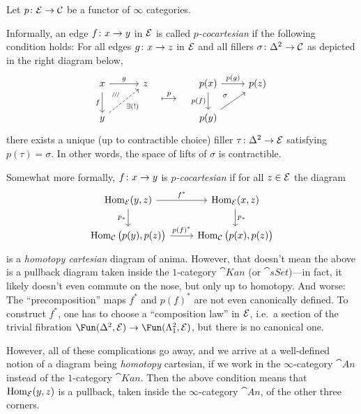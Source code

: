 \documentclass[a4paper, 10pt, oneside, DIV=9, chapterprefix=true, numbers=enddot,bibliography=totoc]{scrbook}
\begin{document}
\begin{defi}\label{def:WeirdCocartesianDefinition}
	Let $p\colon \Ee\morphism\Cc$ be a functor of $\infty$ categories.
	\begin{alphanumerate}
		\item Informally, an edge $f\colon x\morphism y$ in $\mathcal{E}$ is called \emph{$p$-cocartesian} if the following condition holds: For all edges $g\colon x\morphism z$ in $\mathcal{E}$ and all fillers $\sigma\colon \Delta^2\morphism \Cc$ as depicted in the right diagram below,
		\begin{equation*}
			\begin{tikzcd}
				\vphantom{p(x)}x\rar["g"]\dar["f"']\drar[phantom,pos=0.25,"\scriptscriptstyle/\!/\!/"] & z\\
				y \urar[dashed,"\exists(!)"'] & \phantom{p(y)}
			\end{tikzcd}\overset{p}{\longmapsto}\quad
			\begin{tikzcd}
				p(x)\rar["p(g)"]\dar["p(f)"']\drar[phantom,pos=0.15,"\scriptstyle\sigma"] & p(z)\\
				p(y) \urar & \phantom{b}
			\end{tikzcd}
		\end{equation*}
		there exists a unique (up to contractible choice) filler $\tau\colon \Delta^2\morphism\Ee$ satisfying $p(\tau)=\sigma$. In other words, the space of lifts of $\sigma$ is contractible.
		
		Somewhat more formally, $f\colon x\morphism y$ is \emph{$p$-cocartesian} if for all $z\in \mathcal{E}$ the diagram
		\begin{equation*}
			\begin{tikzcd}
				\Hom_\Ee(y,z)\rar["f^*"]\dar["p_*"'] & \Hom_\Ee(x,z)\dar["p_*"]\\
				\Hom_\Cc\big(p(y),p(z)\big)\rar["p(f)^*"] & \Hom_\Cc\big(p(x),p(z)\big)
			\end{tikzcd}
		\end{equation*}
		is a \emph{homotopy cartesian} diagram of anima. However, that doesn't mean the above is a pullback diagram taken inside the $1$-category $\cat{Kan}$ (or $\cat{sSet}$)---in fact, it likely doesn't even commute on the nose, but only up to homotopy. And worse: The \enquote{precomposition} maps $f^*$ and $p(f)^*$ are not even canonically defined. To construct $f^*$, one has to choose a \enquote{composition law} in $\mathcal{E}$, i.e.\ a section of the trivial fibration $\Fun(\Delta^2,\Ee)\morphism\Fun(\Lambda_1^2,\Ee)$, but there is no canonical one.
		
		However, all of these complications go away, and we arrive at a well-defined notion of a diagram being \emph{homotopy} cartesian, if we work in the $\infty$-category $\cat{An}$ instead of the $1$-category $\cat{Kan}$. Then the above condition means that $\operatorname{Hom}_{\mathcal{E}}(y,z)$ is a pullback, taken inside the $\infty$-category $\cat{An}$, of the other three corners. 
		

\end{alphanumerate}
\end{defi}
\end{document}
